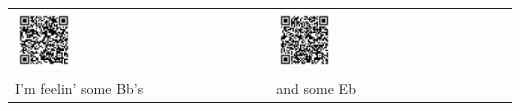 \begin{tabular}{p{} p{} p{}}
  \includegraphics[width=0.25\textwidth]{QR_Codes/QR_AintNoSunshine_Bb.png}
  &
  &
  \includegraphics[width=0.25\textwidth]{QR_Codes/QR_AintNoSunshine_Eb.png}\\                                                     
   I'm feelin' some Bb's
   &
   &
   and some Eb\\
\end{tabular}